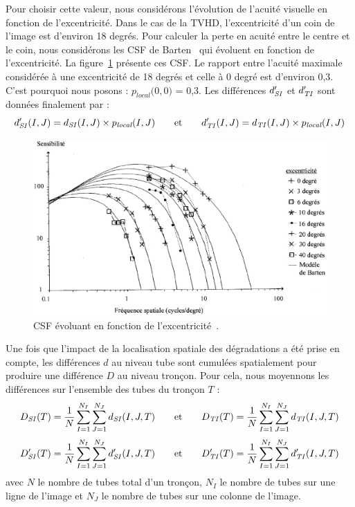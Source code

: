 %
Pour choisir cette valeur, nous considérons l'évolution de l'acuité visuelle en fonction de l'excentricité. Dans le cas de la TVHD, l'excentricité d'un coin de l'image est d'environ 18 degrés. Pour calculer la perte en acuité entre le centre et le coin, nous considérons les CSF de Barten~\cite{barten-book} qui évoluent en fonction de l'excentricité. La figure~\ref{fig:barten} présente ces CSF. Le rapport entre l'acuité maximale considérée à une excentricité de 18 degrés et celle à 0 degré est d'environ 0,3. C'est pourquoi nous posons : $p_{\textit{local}}($0$,$0$)$ = 0,3. %
Les différences $d'_{\mathit{SI}}$ et $d'_{\mathit{TI}}$ sont données finalement par :
\begin{equation}
d'_{\mathit{SI}}(I,J) = d_{\mathit{SI}}(I,J) \times p_{\textit{local}}(I,J) \qquad\text{et}\qquad d'_{\mathit{TI}}(I,J) = d_{\mathit{TI}}(I,J) \times p_{\textit{local}}(I,J)
\end{equation}

\begin{figure}[htbp] %
	\centering
	\includegraphics[width=0.98\linewidth]{img/chap7/barten}
	\caption{CSF évoluant en fonction de l'excentricité~\cite{barten-book}.}
	\label{fig:barten}
\end{figure}

Une fois que l'impact de la localisation spatiale des dégradations a été prise en compte, les différences $d$ au niveau tube sont cumulées spatialement pour produire une différence $D$ au niveau tronçon. Pour cela, nous moyennons les différences sur l'ensemble des tubes du tronçon $T$ :
\begin{equation}
D_{\mathit{SI}}(T) = \frac{1}{N} \sum_{I=1}^{N_I} \sum_{J=1}^{N_J} d_{\mathit{SI}}(I,J,T) \qquad \text{et} \qquad D_{\mathit{TI}}(T) = \frac{1}{N} \sum_{I=1}^{N_I} \sum_{J=1}^{N_J} d_{\mathit{TI}}(I,J,T) \label{eq:dSI}
\end{equation}
\begin{equation}
D'_{\mathit{SI}}(T) = \frac{1}{N} \sum_{I=1}^{N_I} \sum_{J=1}^{N_J} d'_{\mathit{SI}}(I,J,T) \qquad \text{et} \qquad D'_{\mathit{TI}}(T) = \frac{1}{N} \sum_{I=1}^{N_I} \sum_{J=1}^{N_J} d'_{\mathit{TI}}(I,J,T) \label{eq:dTI}
\end{equation}
%
avec $N$ le nombre de tubes total d'un tronçon, $N_I$ le nombre de tubes sur une ligne de l'image et $N_J$ le nombre de tubes sur une colonne de l'image.



